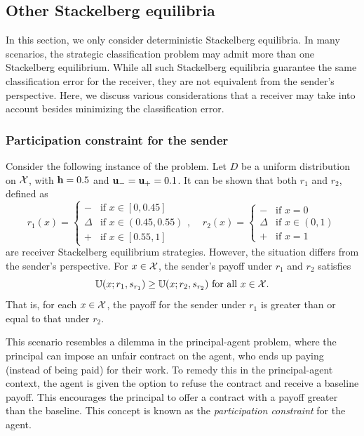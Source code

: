 \subsection{Other Stackelberg equilibria}\label{subsec:Other equilibria}
In this section, we only consider deterministic Stackelberg equilibria. In many scenarios, the strategic classification problem may admit more than one Stackelberg equilibrium. While all such Stackelberg equilibria guarantee the same classification error for the receiver, they are not equivalent from the sender's perspective. Here, we discuss various considerations that a receiver may take into account besides minimizing the classification error.

\subsubsection{Participation constraint for the sender}
Consider the following instance of the problem. Let $D$ be a uniform distribution on $\mathcal{X}$, with $\mathbf{h} = 0.5$ and $\mathbf{u_-} = \mathbf{u_+} = 0.1$. It can be shown that both $r_1$ and $r_2$, defined as
\begin{equation*}
r_1(x) = \begin{cases}
\minus & \text{if } x \in [0, 0.45] \\
\Delta & \text{if } x \in (0.45, 0.55) \\
\plus & \text{if } x \in [0.55, 1]
\end{cases}, \;\;\;\;
r_2(x) = \begin{cases}
\minus & \text{if } x = 0 \\
\Delta & \text{if } x \in (0, 1) \\
\plus & \text{if } x = 1
\end{cases}
\end{equation*}
are receiver Stackelberg equilibrium strategies. However, the situation differs from the sender's perspective. For $x \in \mathcal{X}$, the sender's payoff under $r_1$ and $r_2$ satisfies
\begin{equation}
\mathbb{U}(x; r_1, s_{r_1}) \geq \mathbb{U}(x; r_2, s_{r_2}) \text{ for all } x \in \mathcal{X}.
\end{equation}
That is, for each $x \in \mathcal{X}$, the payoff for the sender under $r_1$ is greater than or equal to that under $r_2$.

This scenario resembles a dilemma in the principal-agent problem, where the principal can impose an unfair contract on the agent, who ends up paying (instead of being paid) for their work. To remedy this in the principal-agent context, the agent is given the option to refuse the contract and receive a baseline payoff. This encourages the principal to offer a contract with a payoff greater than the baseline. This concept is known as the \textit{participation constraint} for the agent.

